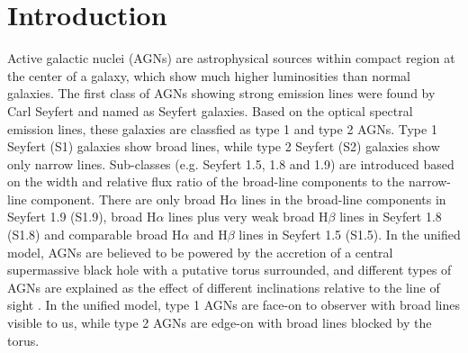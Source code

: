 \documentclass[twocolumn]{aastex63}
\begin{document}
\section{Introduction}\label{sec:intro} 
Active galactic nuclei (AGNs) are astrophysical sources within compact region at the center of a galaxy, which show much higher luminosities than normal galaxies. The first class of AGNs showing strong emission lines were found by Carl Seyfert and named as Seyfert galaxies. Based on the optical spectral emission lines, these galaxies are classfied as type 1 and type 2 AGNs. Type 1 Seyfert (S1) galaxies show broad lines, while type 2 Seyfert (S2) galaxies show only narrow lines. Sub-classes (e.g. Seyfert 1.5, 1.8 and 1.9) are introduced \citep[see ][]{1976MNRAS.176P..61O,1981ApJ...249..462O} based on the width and relative flux ratio of the broad-line components to the narrow-line component. There are only broad H$\alpha$ lines in the broad-line components in Seyfert 1.9 (S1.9), broad H$\alpha$ lines plus very weak broad H$\beta$ lines in Seyfert 1.8 (S1.8) and comparable broad H$\alpha$ and H$\beta$ lines in Seyfert 1.5 (S1.5). In the unified model, AGNs are believed to be powered by the accretion of a central supermassive black hole with a putative torus surrounded, and different types of AGNs are explained as the effect of different inclinations relative to the line of sight \citep[see][]{1993ARA&A..31..473A}. In the unified model, type 1 AGNs are face-on to observer with broad lines visible to us, while type 2 AGNs are edge-on with broad lines blocked by the torus.
\end{document}
